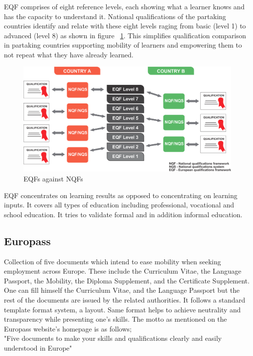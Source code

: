 \documentclass[12pt,a4paper,oneside]{book}
\begin{document}
    EQF comprises of eight reference levels, each showing what a learner knows and has the capacity to understand it. National qualifications of the partaking countries identify and relate with these eight levels raging from basic (level 1) to advanced (level 8) as shown in figure ~\ref{fig:EQF}. This simplifies qualification comparison in partaking countries supporting mobility of learners and empowering them to not repeat what they have already learned. \\

\begin{figure}[!hbp]
  \centering
  \includegraphics[width=14cm]{eqf.png}
  \caption{EQFs against NQFs \cite{MAPQFTOOL}}
  \label{fig:EQF}
\end{figure}

    EQF concentrates on learning results as opposed to concentrating on learning inputs. It covers all types of education including professional, vocational and school education. It tries to validate formal and in addition informal education. 

    \subsection{Europass}
    Collection of five documents which intend to ease mobility when seeking employment across Europe. These include the Curriculum Vitae, the Language Passport, the Mobility, the Diploma Supplement, and the Certificate Supplement. One can fill himself the Curriculum Vitae, and the Language Passport but the rest of the documents are issued by the related authorities. It follows a standard template format system, a layout. Same format helps to achieve neutrality and transparency while presenting one's skills. The motto as mentioned on the Europass website's homepage is as follows; \\
    "Five documents to make your skills and qualifications clearly and easily understood in Europe" \cite{Europass Web} \\
\end{document}
